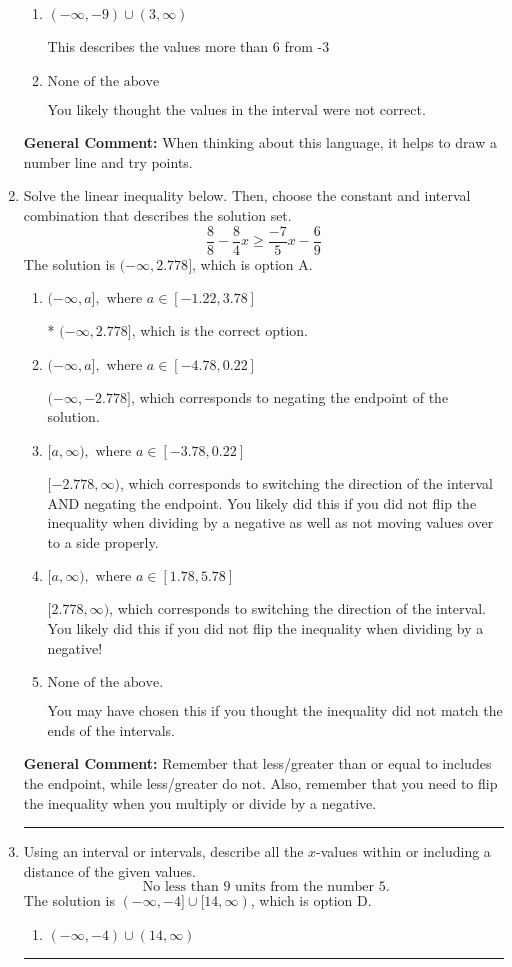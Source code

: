 \documentclass{extbook}[14pt]
\newcommand{\litem}[1]{\item #1

\rule{\textwidth}{0.4pt}}
\begin{document}
\begin{enumerate}
{\begin{enumerate}[label=\Alph*.]
This describes the values less than 6 from -3
\item \( (-\infty, -9) \cup (3, \infty) \)

This describes the values more than 6 from -3
\item \( \text{None of the above} \)

You likely thought the values in the interval were not correct.
\end{enumerate}

\textbf{General Comment:} When thinking about this language, it helps to draw a number line and try points.
}
\litem{
Solve the linear inequality below. Then, choose the constant and interval combination that describes the solution set.
\[ \frac{8}{8} - \frac{8}{4} x \geq \frac{-7}{5} x - \frac{6}{9} \]The solution is \( (-\infty, 2.778] \), which is option A.\begin{enumerate}[label=\Alph*.]
\item \( (-\infty, a], \text{ where } a \in [-1.22, 3.78] \)

* $(-\infty, 2.778]$, which is the correct option.
\item \( (-\infty, a], \text{ where } a \in [-4.78, 0.22] \)

 $(-\infty, -2.778]$, which corresponds to negating the endpoint of the solution.
\item \( [a, \infty), \text{ where } a \in [-3.78, 0.22] \)

 $[-2.778, \infty)$, which corresponds to switching the direction of the interval AND negating the endpoint. You likely did this if you did not flip the inequality when dividing by a negative as well as not moving values over to a side properly.
\item \( [a, \infty), \text{ where } a \in [1.78, 5.78] \)

 $[2.778, \infty)$, which corresponds to switching the direction of the interval. You likely did this if you did not flip the inequality when dividing by a negative!
\item \( \text{None of the above}. \)

You may have chosen this if you thought the inequality did not match the ends of the intervals.
\end{enumerate}

\textbf{General Comment:} Remember that less/greater than or equal to includes the endpoint, while less/greater do not. Also, remember that you need to flip the inequality when you multiply or divide by a negative.
}
\litem{
Using an interval or intervals, describe all the $x$-values within or including a distance of the given values.
\[ \text{ No less than } 9 \text{ units from the number } 5. \]The solution is \( (-\infty, -4] \cup [14, \infty) \), which is option D.\begin{enumerate}[label=\Alph*.]
\item \( (-\infty, -4) \cup (14, \infty) \)


\end{enumerate}}
\end{enumerate}
\end{document}

